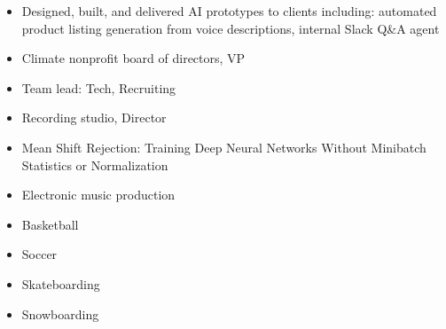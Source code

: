 \documentclass{my_cv}
\begin{document}
\begin{multicols}{2}
    \begin{spacing}{1}
    \begin{itemize}
        \item Designed, built, and delivered AI prototypes to clients including: automated product listing generation from voice descriptions, internal Slack Q\&A agent
    \end{itemize}
    
    \begin{itemize}
        \item Climate nonprofit board of directors, VP
        \item Team lead: Tech, Recruiting
    \end{itemize}
    \begin{itemize}
        \item Recording studio, Director
    \end{itemize}
    \end{spacing}

    
    \columnbreak
    
    \begin{itemize}
        \item Mean Shift Rejection: Training Deep Neural Networks Without Minibatch Statistics or Normalization \href{https://arxiv.org/abs/1911.13173}{\faLink}
    \end{itemize}
    \begin{itemize}
        \item Electronic music production
        \item Basketball
        \item Soccer
        \item Skateboarding
        \item Snowboarding
        
    \end{itemize}
\end{multicols}
\end{document}
